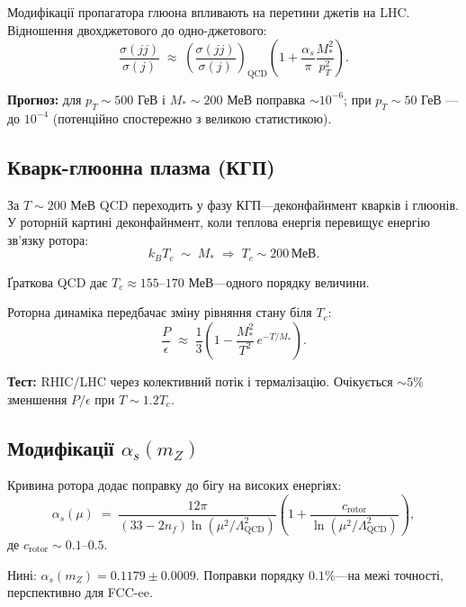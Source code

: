 \documentclass[11pt,a4paper]{article}
\theoremstyle{definition}
\theoremstyle{plain}
\theoremstyle{remark}
\begin{document}
Модифікації пропагатора глюона впливають на перетини джетів на LHC. Відношення двохджетового до одно-джетового:
\begin{equation}
\frac{\sigma(jj)}{\sigma(j)} \;\approx\; \left(\frac{\sigma(jj)}{\sigma(j)}\right)_{\mathrm{QCD}}\left(1 + \frac{\alpha_s}{\pi}\frac{M_\ast^2}{p_T^2}\right).
\end{equation}

\textbf{Прогноз:} для $p_T\sim 500$ ГеВ і $M_\ast\sim 200$ МеВ поправка $\sim 10^{-6}$; при $p_T\sim 50$ ГеВ — до $10^{-4}$ (потенційно спостережно з великою статистикою).

\subsection{Кварк-глюонна плазма (КГП)}

За $T\sim 200$ МеВ QCD переходить у фазу КГП—деконфайнмент кварків і глюонів. У роторній картині деконфайнмент, коли теплова енергія перевищує енергію зв’язку ротора:
\begin{equation}
k_B T_c \;\sim\; M_\ast \;\Rightarrow\; T_c \sim 200\,\text{МеВ}.
\end{equation}

Ґраткова QCD дає $T_c\approx 155$–$170$ МеВ—одного порядку величини.

Роторна динаміка передбачає зміну рівняння стану біля $T_c$:
\begin{equation}
\frac{P}{\epsilon} \;\approx\; \frac{1}{3}\left(1 - \frac{M_\ast^2}{T^2}\,e^{-T/M_\ast}\right).
\end{equation}

\textbf{Тест:} RHIC/LHC через колективний потік і термалізацію. Очікується $\sim 5\%$ зменшення $P/\epsilon$ при $T\sim 1{.}2T_c$.

\subsection{Модифікації $\alpha_s(m_Z)$}

Кривина ротора додає поправку до бігу на високих енергіях:
\begin{equation}
\alpha_s(\mu) \;=\; \frac{12\pi}{(33-2n_f)\ln(\mu^2/\Lambda_{\mathrm{QCD}}^2)}\left(1 + \frac{c_{\mathrm{rotor}}}{\ln(\mu^2/\Lambda_{\mathrm{QCD}}^2)}\right),
\end{equation}
де $c_{\mathrm{rotor}}\sim 0{.}1$–$0{.}5$.

Нині: $\alpha_s(m_Z)=0{.}1179\pm 0{.}0009$. Поправки порядку $0{.}1\%$—на межі точності, перспективно для FCC-ee.
\end{document}
